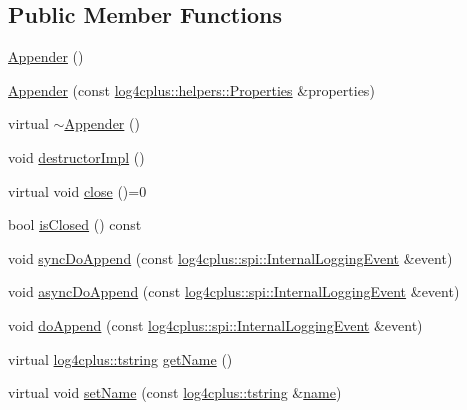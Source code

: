 \subsection*{Public Member Functions}
\begin{DoxyCompactItemize}
\item 
\hyperlink{classlog4cplus_1_1Appender_a3eb5d892b0c1fd66f5b89ecb51b5a4ab}{Appender} ()
\item 
\hyperlink{classlog4cplus_1_1Appender_a87c200f3f9fb818136d45aeb9e58de74}{Appender} (const \hyperlink{classlog4cplus_1_1helpers_1_1Properties}{log4cplus\-::helpers\-::\-Properties} \&properties)
\item 
virtual \hyperlink{classlog4cplus_1_1Appender_ac1e43b99fdbff379a5b5aaa62cff8181}{$\sim$\-Appender} ()
\item 
void \hyperlink{classlog4cplus_1_1Appender_af7247536ea97279c5863503b2ac349ca}{destructor\-Impl} ()
\item 
virtual void \hyperlink{classlog4cplus_1_1Appender_a0bd9b2567e1c82e589dec97f74abf689}{close} ()=0
\item 
bool \hyperlink{classlog4cplus_1_1Appender_a491aaf3c77bb8aa52116b3fafd73338b}{is\-Closed} () const 
\item 
void \hyperlink{classlog4cplus_1_1Appender_a2718aa4c67280dfe1908e7a65779bd4b}{sync\-Do\-Append} (const \hyperlink{classlog4cplus_1_1spi_1_1InternalLoggingEvent}{log4cplus\-::spi\-::\-Internal\-Logging\-Event} \&event)
\item 
void \hyperlink{classlog4cplus_1_1Appender_a13188bfd262e7629a36180a4650575a6}{async\-Do\-Append} (const \hyperlink{classlog4cplus_1_1spi_1_1InternalLoggingEvent}{log4cplus\-::spi\-::\-Internal\-Logging\-Event} \&event)
\item 
void \hyperlink{classlog4cplus_1_1Appender_a63d9da23fa8956db3648adee75a5ff38}{do\-Append} (const \hyperlink{classlog4cplus_1_1spi_1_1InternalLoggingEvent}{log4cplus\-::spi\-::\-Internal\-Logging\-Event} \&event)
\item 
virtual \hyperlink{namespacelog4cplus_a3c9287f6ebcddc50355e29d71152117b}{log4cplus\-::tstring} \hyperlink{classlog4cplus_1_1Appender_a1830bdf9afaffd6045596d709abb9df8}{get\-Name} ()
\item 
virtual void \hyperlink{classlog4cplus_1_1Appender_a8e000f82601a1785f16e68effc948cc4}{set\-Name} (const \hyperlink{namespacelog4cplus_a3c9287f6ebcddc50355e29d71152117b}{log4cplus\-::tstring} \&\hyperlink{classlog4cplus_1_1Appender_a7396e57f462275efb5c4050ef76230b2}{name})
\item 

\end{DoxyCompactItemize}
